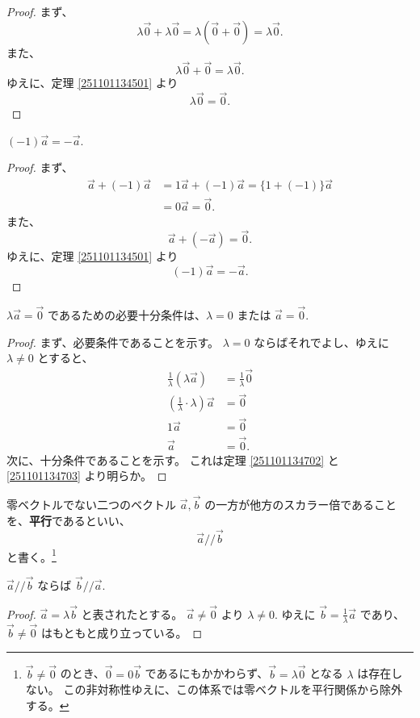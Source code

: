 \begin{proof}
  まず、
  \[\lambda\vec{0}+\lambda\vec{0}=\lambda(\vec{0}+\vec{0})=\lambda\vec{0}.\]
  また、
  \[\lambda\vec{0}+\vec{0}=\lambda\vec{0}.\]
  ゆえに、定理 \ref{251101134501} より
  \[\lambda\vec{0}=\vec{0}.\]
\end{proof}

\begin{thm}
  \((-1)\vec{a}=-\vec{a}.\)
\end{thm}

\begin{proof}
  まず、
  \begin{align*}
    \vec{a}+(-1)\vec{a} &= 1\vec{a}+(-1)\vec{a}=\{1+(-1)\}\vec{a} \\
                        &= 0\vec{a}=\vec{0}.
  \end{align*}
  また、
  \[\vec{a}+(-\vec{a})=\vec{0}.\]
  ゆえに、定理 \ref{251101134501} より
  \[(-1)\vec{a}=-\vec{a}.\]
\end{proof}

\begin{thm}
  \(\lambda\vec{a}=\vec{0}\) であるための必要十分条件は、\(\lambda=0\) または \(\vec{a}=\vec{0}.\)
\end{thm}

\begin{proof}
  まず、必要条件であることを示す。
  \(\lambda=0\) ならばそれでよし、ゆえに \(\lambda\neq0\) とすると、
  \begin{align*}
                    \frac{1}{\lambda}(\lambda\vec{a}) &= \frac{1}{\lambda}\vec{0} \\
    \left(\frac{1}{\lambda}\cdot\lambda\right)\vec{a} &= \vec{0} \\
                                             1\vec{a} &= \vec{0} \\
                                              \vec{a} &= \vec{0}.
  \end{align*}
  次に、十分条件であることを示す。
  これは定理 \ref{251101134702} と \ref{251101134703} より明らか。
\end{proof}

\begin{dfn}[ベクトルの平行]
  零ベクトルでない二つのベクトル \(\vec{a},\vec{b}\) の一方が他方のスカラー倍であることを、\textbf{平行}であるといい、
  \[\vec{a}/\!/\vec{b}\]
  と書く。\footnote{\(\vec{b}\neq\vec{0}\) のとき、\(\vec{0}=0\vec{b}\) であるにもかかわらず、\(\vec{b}=\lambda\vec{0}\) となる \(\lambda\) は存在しない。
  この非対称性ゆえに、この体系では零ベクトルを平行関係から除外する。}
\end{dfn}

\begin{thm}
  \(\vec{a}/\!/\vec{b}\) ならば \(\vec{b}/\!/\vec{a}.\)
\end{thm}

\begin{proof}
  \(\vec{a}=\lambda\vec{b}\) と表されたとする。
  \(\vec{a}\neq\vec{0}\) より \(\lambda\neq0.\)
  ゆえに \(\displaystyle \vec{b}=\frac{1}{\lambda}\vec{a}\) であり、
  \(\vec{b}\neq\vec{0}\) はもともと成り立っている。
\end{proof}
